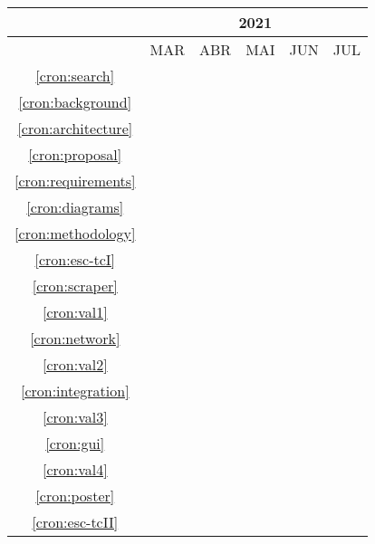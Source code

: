 \begin{table}[!htbp]
	\centering
		\begin{tabular}{|c|c|c|c|c|c|}
		\hline
		&\multicolumn{5}{c|}{2021}\\
		\hline
		&MAR&ABR&MAI&JUN&JUL\\
		\hline
		\ref{cron:search}&\cellcolor{midgray}&&&&\\
		\hline
		\ref{cron:background}&\cellcolor{midgray}&&&&\\
		\hline
		\ref{cron:architecture}&&\cellcolor{midgray}&&&\\
		\hline
		\ref{cron:proposal}&&\cellcolor{midgray}&&&\\
		\hline
		\ref{cron:requirements}&&\cellcolor{midgray}&&&\\
		\hline	
		\ref{cron:diagrams}&&\cellcolor{midgray}&&&\\
		\hline			
		\ref{cron:methodology}&&\cellcolor{midgray}&&&\\
		\hline	
		\ref{cron:esc-tcI}&&\cellcolor{midgray}&&&\\
		\hline	
		\ref{cron:scraper}&&&\cellcolor{midgray}&&\\
		\hline
		\ref{cron:val1}&&&\cellcolor{midgray}&&\\
		\hline	
		\ref{cron:network}&&&\cellcolor{midgray}&&\\
		\hline	
		\ref{cron:val2}&&&\cellcolor{midgray}&&\\
		\hline	
		\ref{cron:integration}&&&&\cellcolor{midgray}&\\
		\hline	
		\ref{cron:val3}&&&&\cellcolor{midgray}&\\
		\hline	
		\ref{cron:gui}&&&&\cellcolor{midgray}&\\
		\hline	
		\ref{cron:val4}&&&&\cellcolor{midgray}&\\
		\hline
		\ref{cron:poster}&&&&\cellcolor{midgray}&\\
		\hline
		\ref{cron:esc-tcII}&&&&&\cellcolor{midgray}\\
		\hline	
		\end{tabular}
\end{table}

